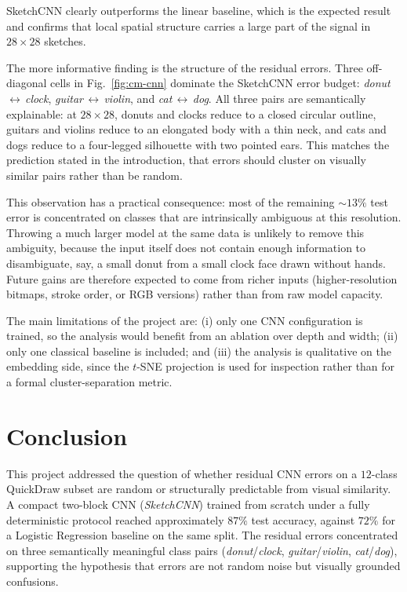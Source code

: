 \documentclass[10pt,twocolumn,a4paper]{article}
\begin{document}
SketchCNN clearly outperforms the linear baseline, which is the expected
result and confirms that local spatial structure carries a large part of the
signal in $28\times28$ sketches.

The more informative finding is the structure of the residual errors. Three
off-diagonal cells in Fig.~\ref{fig:cm-cnn} dominate the SketchCNN error
budget: \emph{donut}\,$\leftrightarrow$\,\emph{clock},
\emph{guitar}\,$\leftrightarrow$\,\emph{violin}, and
\emph{cat}\,$\leftrightarrow$\,\emph{dog}. All three pairs are semantically
explainable: at $28\times28$, donuts and clocks reduce to a closed circular
outline, guitars and violins reduce to an elongated body with a thin neck,
and cats and dogs reduce to a four-legged silhouette with two pointed ears.
This matches the prediction stated in the introduction, that errors should
cluster on visually similar pairs rather than be random.

This observation has a practical consequence: most of the remaining $\sim
13\%$ test error is concentrated on classes that are intrinsically ambiguous
at this resolution. Throwing a much larger model at the same data is unlikely
to remove this ambiguity, because the input itself does not contain enough
information to disambiguate, say, a small donut from a small clock face
drawn without hands. Future gains are therefore expected to come from richer
inputs (higher-resolution bitmaps, stroke order, or RGB versions) rather
than from raw model capacity.

The main limitations of the project are: (i) only one CNN configuration is
trained, so the analysis would benefit from an ablation over depth and width;
(ii) only one classical baseline is included; and (iii) the analysis is
qualitative on the embedding side, since the $t$-SNE projection is used for
inspection rather than for a formal cluster-separation metric.

\section{Conclusion}
\label{sec:conclusion}

This project addressed the question of whether residual CNN errors on a
$12$-class QuickDraw subset are random or structurally predictable from
visual similarity. A compact two-block CNN (\emph{SketchCNN}) trained from
scratch under a fully deterministic protocol reached approximately $87\%$
test accuracy, against $72\%$ for a Logistic Regression baseline on the same
split. The residual errors concentrated on three semantically meaningful
class pairs (\emph{donut}/\emph{clock}, \emph{guitar}/\emph{violin},
\emph{cat}/\emph{dog}), supporting the hypothesis that errors are not random
noise but visually grounded confusions.
\end{document}
